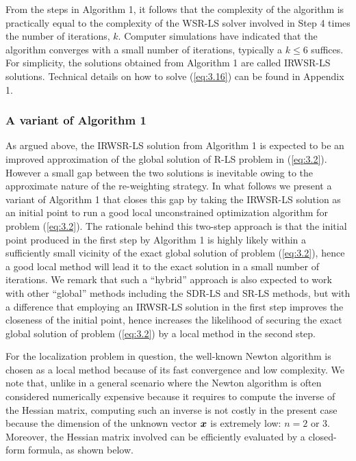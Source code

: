 \phantom{m}

From the steps in Algorithm 1, it follows that the complexity of the algorithm is practically equal to the complexity of the WSR-LS solver involved in Step 4 times the number of iterations, $k$. Computer simulations have indicated that the algorithm converges with a small number of iterations, typically a $k\leq6$  suffices. For simplicity, the solutions obtained from Algorithm 1 are called IRWSR-LS solutions. Technical details on how to solve (\ref{eq:3.16}) can be found in Appendix 1.

\subsubsection{A variant of Algorithm 1}%

As argued above, the IRWSR-LS solution from Algorithm 1 is expected to be an improved approximation of the global solution of R-LS problem in (\ref{eq:3.2}). However a small gap between the two solutions is inevitable owing to the approximate nature of the re-weighting strategy. In what follows we present a variant of Algorithm 1 that closes this gap by taking the IRWSR-LS solution as an initial point to run a good local unconstrained optimization algorithm for problem (\ref{eq:3.2}).  The rationale behind this two-step approach is that the initial point produced in the first step by Algorithm 1 is highly likely within a sufficiently small vicinity of the exact global solution of problem (\ref{eq:3.2}), hence a good local method will lead it to the exact solution in a small number of iterations. We remark that such a ``hybrid'' approach is also expected to work with other ``global'' methods including the SDR-LS and SR-LS methods, but with a difference that employing an IRWSR-LS solution in the first step improves the closeness of the initial point, hence increases the likelihood of securing the exact global solution of problem (\ref{eq:3.2}) by a local method in the second step.

For the localization problem in question, the well-known Newton algorithm \cite{AntonLu} is chosen as a local method because of its fast convergence and low complexity. We note that, unlike in a general scenario where the Newton algorithm is often considered numerically expensive because it requires to compute the inverse of the Hessian matrix, computing such an inverse is not costly in the present case because the dimension of the unknown vector $\mbox{\boldmath$x$}$ is extremely low: $n = 2$ or $3$. Moreover, the Hessian matrix involved can be efficiently evaluated by a closed-form formula, as shown below.

